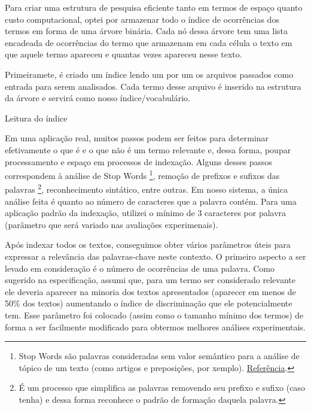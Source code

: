 \documentclass[12pt]{article}
\begin{document}
Para criar uma estrutura de pesquisa eficiente tanto em termos de espaço quanto
custo computacional, optei por armazenar todo o índice de ocorrências dos termos
em forma de uma árvore binária. Cada nó dessa árvore tem uma lista encadeada de
ocorrências do termo que armazenam em cada célula o texto em que aquele termo
apareceu e quantas vezes apareceu nesse texto.

Primeiramete, é criado um índice lendo um por um os arquivos passados como
entrada para serem analisados. Cada termo desse arquivo é inserido na estrutura
da árvore e servirá como nosso índice/vocabulário.

\begin{algorithm}[h!]
\begin{footnotesize}
\caption{Leitura do índice}
\end{footnotesize}
\end{algorithm}

Em uma aplicação real, muitos passos podem ser feitos para determinar
efetivamente o que é e o que não é um termo relevante e, dessa forma, poupar
processamento e espaço em processos de indexação. Alguns desses passos
correspondem à análise de Stop Words \footnote{Stop Words são palavras consideradas sem valor
semântico para a análise de tópico de um texto (como artigos e preposições, por
xemplo). \href{http://searchenginewatch.com/2156061}{Referência}.}, remoção de
prefixos e sufixos das palavras \footnote{É um processo que simplifica as
palavras removendo seu prefixo e sufixo (caso tenha) e dessa forma reconhece o
padrão de formação daquela palavra.}, reconhecimento sintático, entre outras. 
Em nosso sistema, a única análise feita é quanto ao número de caracteres que a 
palavra contém. Para uma aplicação padrão da indexação, utilizei o mínimo de 3 
caracteres por palavra (parâmetro que será variado nas avaliações experimenais).

Após indexar todos os textos, conseguimos obter vários parâmetros úteis para
expressar a relevância das palavras-chave neste contexto. O primeiro aspecto a ser
levado em consideração é o número de ocorrências de uma palavra. Como sugerido
na especificação, assumi que, para um termo ser considerado relevante ele
deveria aparecer na minoria dos textos apresentados (aparecer em menos de 50\%
dos textos) aumentando o índice de discriminação que ele potencialmente tem.
Esse parâmetro foi colocado (assim como o tamanho mínimo dos termos) de forma a
ser facilmente modificado para obtermos melhores análises experimentais.
\end{document}
